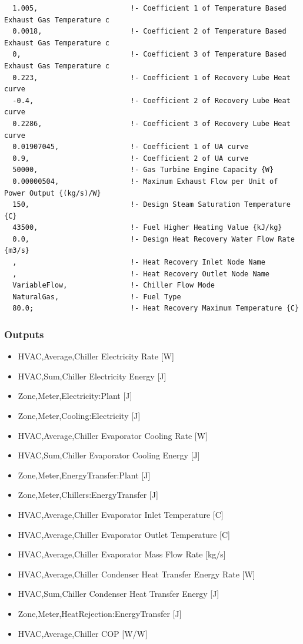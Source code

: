\begin{lstlisting}
  1.005,                      !- Coefficient 1 of Temperature Based Exhaust Gas Temperature c
  0.0018,                     !- Coefficient 2 of Temperature Based Exhaust Gas Temperature c
  0,                          !- Coefficient 3 of Temperature Based Exhaust Gas Temperature c
  0.223,                      !- Coefficient 1 of Recovery Lube Heat curve
  -0.4,                       !- Coefficient 2 of Recovery Lube Heat curve
  0.2286,                     !- Coefficient 3 of Recovery Lube Heat curve
  0.01907045,                 !- Coefficient 1 of UA curve
  0.9,                        !- Coefficient 2 of UA curve
  50000,                      !- Gas Turbine Engine Capacity {W}
  0.00000504,                 !- Maximum Exhaust Flow per Unit of Power Output {(kg/s)/W}
  150,                        !- Design Steam Saturation Temperature {C}
  43500,                      !- Fuel Higher Heating Value {kJ/kg}
  0.0,                        !- Design Heat Recovery Water Flow Rate {m3/s}
  ,                           !- Heat Recovery Inlet Node Name
  ,                           !- Heat Recovery Outlet Node Name
  VariableFlow,               !- Chiller Flow Mode
  NaturalGas,                 !- Fuel Type
  80.0;                       !- Heat Recovery Maximum Temperature {C}
\end{lstlisting}

\subsubsection{Outputs}\label{outputs-7-006}

\begin{itemize}
    \item
    HVAC,Average,Chiller Electricity Rate {[}W{]}
    \item
    HVAC,Sum,Chiller Electricity Energy {[}J{]}
    \item
    Zone,Meter,Electricity:Plant {[}J{]}
    \item
    Zone,Meter,Cooling:Electricity {[}J{]}
    \item
    HVAC,Average,Chiller Evaporator Cooling Rate {[}W{]}
    \item
    HVAC,Sum,Chiller Evaporator Cooling Energy {[}J{]}
    \item
    Zone,Meter,EnergyTransfer:Plant {[}J{]}
    \item
    Zone,Meter,Chillers:EnergyTransfer {[}J{]}
    \item
    HVAC,Average,Chiller Evaporator Inlet Temperature {[}C{]}
    \item
    HVAC,Average,Chiller Evaporator Outlet Temperature {[}C{]}
    \item
    HVAC,Average,Chiller Evaporator Mass Flow Rate {[}kg/s{]}
    \item
    HVAC,Average,Chiller Condenser Heat Transfer Energy Rate {[}W{]}
    \item
    HVAC,Sum,Chiller Condenser Heat Transfer Energy {[}J{]}
    \item
    Zone,Meter,HeatRejection:EnergyTransfer {[}J{]}
    \item
    HVAC,Average,Chiller COP {[}W/W{]}
\end{itemize}

